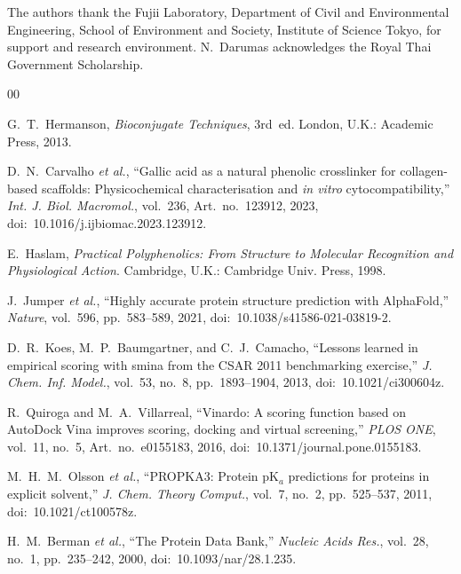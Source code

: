 \documentclass[11pt]{article}
\begin{document}
The authors thank the Fujii Laboratory, Department of Civil and Environmental
Engineering, School of Environment and Society, Institute of Science Tokyo,
for support and research environment.  N.~Darumas acknowledges the Royal Thai
Government Scholarship.


\begin{thebibliography}{00}

G.~T.~Hermanson, \emph{Bioconjugate Techniques}, 3rd~ed.
London, U.K.: Academic Press, 2013.

D.~N.~Carvalho \emph{et al.}, ``Gallic acid as a natural phenolic crosslinker
for collagen-based scaffolds: Physicochemical characterisation and
\emph{in vitro} cytocompatibility,''
\emph{Int. J. Biol. Macromol.}, vol.~236, Art.~no.~123912, 2023,
doi:~10.1016/j.ijbiomac.2023.123912.

E.~Haslam, \emph{Practical Polyphenolics: From Structure to Molecular
Recognition and Physiological Action}.
Cambridge, U.K.: Cambridge Univ. Press, 1998.

J.~Jumper \emph{et al.}, ``Highly accurate protein structure prediction with
AlphaFold,'' \emph{Nature}, vol.~596, pp.~583--589, 2021,
doi:~10.1038/s41586-021-03819-2.

D.~R.~Koes, M.~P.~Baumgartner, and C.~J.~Camacho, ``Lessons learned in
empirical scoring with smina from the CSAR 2011 benchmarking exercise,''
\emph{J. Chem. Inf. Model.}, vol.~53, no.~8, pp.~1893--1904, 2013,
doi:~10.1021/ci300604z.

R.~Quiroga and M.~A.~Villarreal, ``Vinardo: A scoring function based on
AutoDock Vina improves scoring, docking and virtual screening,''
\emph{PLOS ONE}, vol.~11, no.~5, Art.~no.~e0155183, 2016,
doi:~10.1371/journal.pone.0155183.

M.~H.~M.~Olsson \emph{et al.}, ``PROPKA3: Protein pK$_{a}$ predictions for
proteins in explicit solvent,'' \emph{J. Chem. Theory Comput.}, vol.~7,
no.~2, pp.~525--537, 2011, doi:~10.1021/ct100578z.

H.~M.~Berman \emph{et al.}, ``The Protein Data Bank,''
\emph{Nucleic Acids Res.}, vol.~28, no.~1, pp.~235--242, 2000,
doi:~10.1093/nar/28.1.235.


\end{thebibliography}
\end{document}
